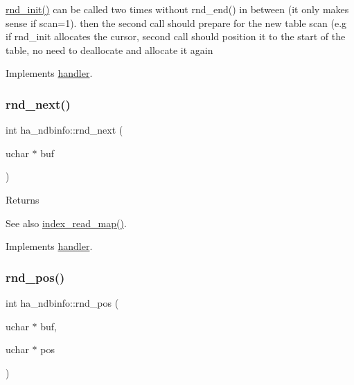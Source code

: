 \mbox{\hyperlink{classha__ndbinfo_a0157ed0545e9748cccbd9b58a7178529}{rnd\+\_\+init()}} can be called two times without rnd\+\_\+end() in between (it only makes sense if scan=1). then the second call should prepare for the new table scan (e.\+g if rnd\+\_\+init allocates the cursor, second call should position it to the start of the table, no need to deallocate and allocate it again 

Implements \mbox{\hyperlink{classhandler}{handler}}.

\mbox{\label{classha__ndbinfo_aafb71ce870019170b8949672a26387c3}} 
\subsubsection{\texorpdfstring{rnd\+\_\+next()}{rnd\_next()}}
{\footnotesize\ttfamily int ha\+\_\+ndbinfo\+::rnd\+\_\+next (\begin{DoxyParamCaption}\item[{uchar $\ast$}]{buf }\end{DoxyParamCaption})\hspace{0.3cm}{\ttfamily [virtual]}}

\begin{DoxyReturn}{Returns}

\end{DoxyReturn}
\begin{DoxySeeAlso}{See also}
\mbox{\hyperlink{classhandler_af8c2b258691e5baac8dd22d19c084b37}{index\+\_\+read\+\_\+map()}}. 
\end{DoxySeeAlso}


Implements \mbox{\hyperlink{classhandler_a48cb9c94ca93dbfbb7e92822caba82a1}{handler}}.

\mbox{\label{classha__ndbinfo_a3c82928e6d10f1e83b118cc6fa7ce088}} 
\subsubsection{\texorpdfstring{rnd\+\_\+pos()}{rnd\_pos()}}
{\footnotesize\ttfamily int ha\+\_\+ndbinfo\+::rnd\+\_\+pos (\begin{DoxyParamCaption}\item[{uchar $\ast$}]{buf,  }\item[{uchar $\ast$}]{pos }\end{DoxyParamCaption})\hspace{0.3cm}{\ttfamily [virtual]}}

